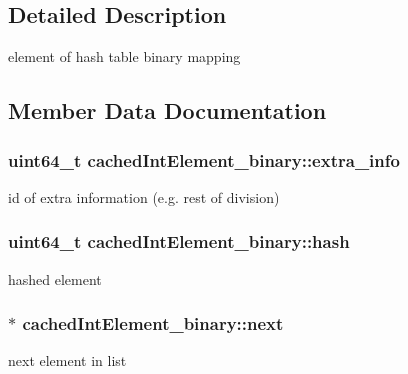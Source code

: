 \subsection{Detailed Description}
element of hash table binary mapping 

\subsection{Member Data Documentation}
\subsubsection[{\texorpdfstring{extra\+\_\+info}{extra_info}}]{\setlength{\rightskip}{0pt plus 5cm}uint64\+\_\+t cached\+Int\+Element\+\_\+binary\+::extra\+\_\+info}\hypertarget{structcachedIntElement__binary_a61b3637cb5d56531c17cc07aff0b8f84}{}\label{structcachedIntElement__binary_a61b3637cb5d56531c17cc07aff0b8f84}
id of extra information (e.\+g. rest of division) 
\subsubsection[{\texorpdfstring{hash}{hash}}]{\setlength{\rightskip}{0pt plus 5cm}uint64\+\_\+t cached\+Int\+Element\+\_\+binary\+::hash}\hypertarget{structcachedIntElement__binary_ad9d23892ecafef09a352699e01aebecc}{}\label{structcachedIntElement__binary_ad9d23892ecafef09a352699e01aebecc}
hashed element 
\subsubsection[{\texorpdfstring{next}{next}}]{$\ast$ cached\+Int\+Element\+\_\+binary\+::next}\hypertarget{structcachedIntElement__binary_a500da0d9af2a1138003bf6b6f0c22555}{}\label{structcachedIntElement__binary_a500da0d9af2a1138003bf6b6f0c22555}
next element in list 

